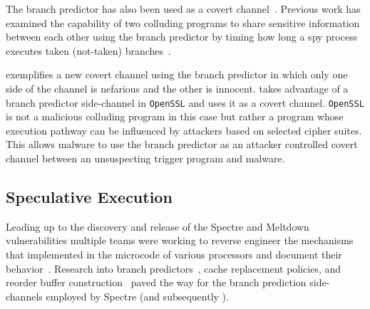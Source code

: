 The branch predictor has also been used as a covert
channel~\cite{evtyushkin2016understanding}. Previous work has examined the
capability of two colluding programs to share sensitive information between each
other using the branch predictor by timing how long a spy process executes taken
(not-taken) branches~\cite{evtyushkin2015covert}.

\speculake exemplifies a new covert channel using the branch predictor in which
only one side of the channel is nefarious and the other is innocent. \speculake
takes advantage of a branch predictor side-channel in \texttt{OpenSSL} and uses
it as a covert channel. \texttt{OpenSSL} is not a malicious colluding program in
this case but rather a program whose execution pathway can be influenced by
attackers based on selected cipher suites. This allows malware to use the branch
predictor as an attacker controlled covert channel between an unsuspecting
trigger program and \speculake malware.




\subsection{Speculative Execution}

Leading up to the discovery and release of the Spectre and Meltdown
vulnerabilities multiple teams were working to reverse engineer the mechanisms
that implemented in the microcode of various processors and document their
behavior~\cite{intel-instruction-tables,project_zero,measuring-cache,measuring-rob}.
Research into branch predictors~\cite{godbolt2016branch}, cache replacement
policies, and reorder buffer construction~\cite{measuring-rob} paved the way for
the branch prediction side-channels employed by Spectre (and subsequently
\speculake).

